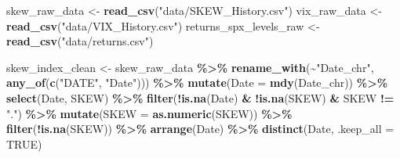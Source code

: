 \documentclass[
]{article}
\newenvironment{Shaded}{\begin{snugshade}}{\end{snugshade}}
\newcommand{\AttributeTok}[1]{\textcolor[rgb]{0.13,0.29,0.53}{#1}}
\newcommand{\ConstantTok}[1]{\textcolor[rgb]{0.56,0.35,0.01}{#1}}
\newcommand{\FunctionTok}[1]{\textcolor[rgb]{0.13,0.29,0.53}{\textbf{#1}}}
\newcommand{\NormalTok}[1]{#1}
\newcommand{\OtherTok}[1]{\textcolor[rgb]{0.56,0.35,0.01}{#1}}
\newcommand{\SpecialCharTok}[1]{\textcolor[rgb]{0.81,0.36,0.00}{\textbf{#1}}}
\newcommand{\StringTok}[1]{\textcolor[rgb]{0.31,0.60,0.02}{#1}}
\begin{document}
\begin{Shaded}
\begin{Highlighting}[]
\NormalTok{  skew\_raw\_data }\OtherTok{\textless{}{-}} \FunctionTok{read\_csv}\NormalTok{(}\StringTok{"data/SKEW\_History.csv"}\NormalTok{)}
\NormalTok{  vix\_raw\_data }\OtherTok{\textless{}{-}} \FunctionTok{read\_csv}\NormalTok{(}\StringTok{"data/VIX\_History.csv"}\NormalTok{)}
\NormalTok{  returns\_spx\_levels\_raw }\OtherTok{\textless{}{-}} \FunctionTok{read\_csv}\NormalTok{(}\StringTok{"data/returns.csv"}\NormalTok{)}
  
\NormalTok{  skew\_index\_clean }\OtherTok{\textless{}{-}}\NormalTok{ skew\_raw\_data }\SpecialCharTok{\%\textgreater{}\%}
    \FunctionTok{rename\_with}\NormalTok{(}\SpecialCharTok{\textasciitilde{}}\StringTok{"Date\_chr"}\NormalTok{, }\FunctionTok{any\_of}\NormalTok{(}\FunctionTok{c}\NormalTok{(}\StringTok{"DATE"}\NormalTok{, }\StringTok{"Date"}\NormalTok{))) }\SpecialCharTok{\%\textgreater{}\%}
    \FunctionTok{mutate}\NormalTok{(}\AttributeTok{Date =} \FunctionTok{mdy}\NormalTok{(Date\_chr)) }\SpecialCharTok{\%\textgreater{}\%}
    \FunctionTok{select}\NormalTok{(Date, SKEW) }\SpecialCharTok{\%\textgreater{}\%}
    \FunctionTok{filter}\NormalTok{(}\SpecialCharTok{!}\FunctionTok{is.na}\NormalTok{(Date) }\SpecialCharTok{\&} \SpecialCharTok{!}\FunctionTok{is.na}\NormalTok{(SKEW) }\SpecialCharTok{\&}\NormalTok{ SKEW }\SpecialCharTok{!=} \StringTok{"."}\NormalTok{) }\SpecialCharTok{\%\textgreater{}\%}
    \FunctionTok{mutate}\NormalTok{(}\AttributeTok{SKEW =} \FunctionTok{as.numeric}\NormalTok{(SKEW)) }\SpecialCharTok{\%\textgreater{}\%}
    \FunctionTok{filter}\NormalTok{(}\SpecialCharTok{!}\FunctionTok{is.na}\NormalTok{(SKEW)) }\SpecialCharTok{\%\textgreater{}\%}
    \FunctionTok{arrange}\NormalTok{(Date) }\SpecialCharTok{\%\textgreater{}\%}
    \FunctionTok{distinct}\NormalTok{(Date, }\AttributeTok{.keep\_all =} \ConstantTok{TRUE}\NormalTok{)}
  

\end{Highlighting}
\end{Shaded}
\end{document}
